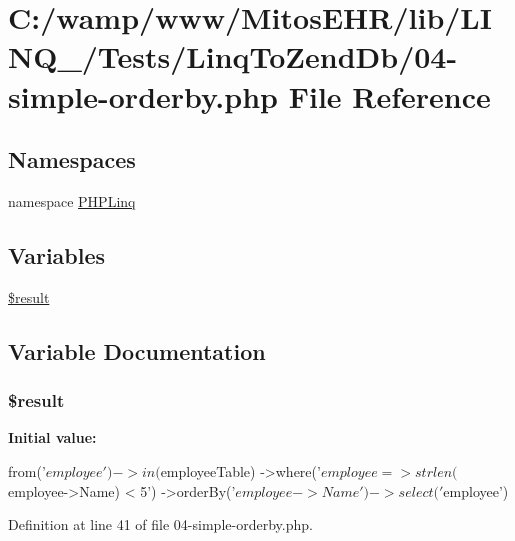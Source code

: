 \hypertarget{_linq_to_zend_db_204-simple-orderby_8php}{\section{\-C\-:/wamp/www/\-Mitos\-E\-H\-R/lib/\-L\-I\-N\-Q\-\_/\-Tests/\-Linq\-To\-Zend\-Db/04-\/simple-\/orderby.php \-File \-Reference}
\label{_linq_to_zend_db_204-simple-orderby_8php}
}
\subsection*{\-Namespaces}
\begin{DoxyCompactItemize}
\item 
namespace \hyperlink{namespace_p_h_p_linq}{\-P\-H\-P\-Linq}
\end{DoxyCompactItemize}
\subsection*{\-Variables}
\begin{DoxyCompactItemize}
\item 
\hyperlink{_linq_to_zend_db_204-simple-orderby_8php_a112ef069ddc0454086e3d1e6d8d55d07}{\$result}
\end{DoxyCompactItemize}


\subsection{\-Variable \-Documentation}
\hypertarget{_linq_to_zend_db_204-simple-orderby_8php_a112ef069ddc0454086e3d1e6d8d55d07}{
\subsubsection[{\$result}]{\setlength{\rightskip}{0pt plus 5cm}\$result}}\label{_linq_to_zend_db_204-simple-orderby_8php_a112ef069ddc0454086e3d1e6d8d55d07}
{\bfseries \-Initial value\-:}
\begin{DoxyCode}
 from('$employee')->in($employeeTable)
                        ->where('$employee => strlen($employee->Name) < 5')
                        ->orderBy('$employee->Name')
                        ->select('$employee')
\end{DoxyCode}


\-Definition at line 41 of file 04-\/simple-\/orderby.\-php.

